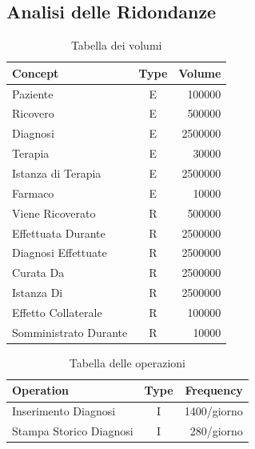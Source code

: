 \documentclass{article}
\begin{document}
\subsection{Analisi delle Ridondanze}
\begin{table}[h!]
  \caption{Tabella dei volumi}
  \label{table:1}
  \centering
  \begin{tabular}{|l|c|r|}
  \hline
  \textbf{Concept} & \textbf{Type} & \textbf{Volume} \\ \hline
  Paziente & E & 100000 \\ \hline
  Ricovero & E & 500000 \\ \hline
  Diagnosi & E & 2500000 \\ \hline
  Terapia & E & 30000 \\ \hline
  Istanza di Terapia & E & 2500000 \\ \hline
  Farmaco & E & 10000 \\ \hline
  Viene Ricoverato & R & 500000 \\ \hline
  Effettuata Durante & R & 2500000 \\ \hline
  Diagnosi Effettuate & R & 2500000 \\ \hline
  Curata Da & R & 2500000 \\ \hline
  Istanza Di & R & 2500000 \\ \hline
  Effetto Collaterale & R & 100000 \\ \hline
  Somministrato Durante  & R & 10000 \\ \hline
  \end{tabular}
  \end{table}
\begin{table}[!ht]
  \caption{Tabella delle operazioni}
  \label{table:2}
  \centering
  \begin{tabular}{|l|c|r|}
  \hline
  \textbf{Operation} & \textbf{Type} & \textbf{Frequency} \\ \hline
  Inserimento Diagnosi & I & 1400/giorno \\ \hline
  Stampa Storico Diagnosi & I & 280/giorno \\ \hline
  \end{tabular}
  \end{table}
\end{document}

